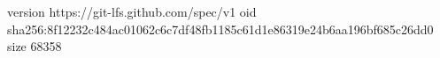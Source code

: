 version https://git-lfs.github.com/spec/v1
oid sha256:8f12232c484ac01062c6c7df48fb1185c61d1e86319e24b6aa196bf685c26dd0
size 68358
